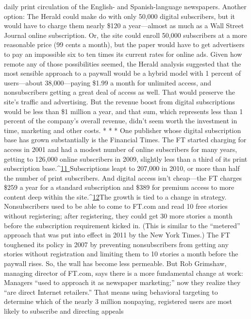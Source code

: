 daily print circulation of the English- and Spanish-language newspapers.
Another option: The Herald could make do with only 50,000 digital subscribers,
but it would have to charge them nearly \$120 a year—almost as much as a Wall
Street Journal online subscription. Or, the site could enroll 50,000 subscribers
at a more reasonable price (99 cents a month), but the paper would have to get
advertisers to pay an impossible six to ten times its current rates for online ads.
Given how remote any of those possibilities seemed, the Herald analysis suggested
that the most sensible approach to a paywall would be a hybrid model
with 1 percent of users—about 38,000—paying \$1.99 a month for unlimited access,
and nonsubscribers getting a great deal of access as well. That would preserve
the site’s traffic and advertising. But the revenue boost from digital subscriptions
would be less than \$1 million a year, and that sum, which represents less than 1
percent of the company’s overall revenue, didn’t seem worth the investment in
time, marketing and other costs.
* * *
One publisher whose digital subscription base has grown substantially is the
Financial Times.
The FT started charging for access in 2001 and had a modest number of online
subscribers for many years, getting to 126,000 online subscribers in 2009, slightly
less than a third of its print subscription base.^{\href{#endnotes-ch5}{11 }}Subscriptions leapt to 207,000
in 2010, or more than half the number of print subscribers. And digital access
isn’t cheap—the FT charges \$259 a year for a standard subscription and \$389 for
premium access to more content deep within the site.^{\href{#endnotes-ch5}{12}}The growth is tied to a change in strategy. Nonsubscribers used to be able to
come to FT.com and read 10 free stories without registering; after registering,
they could get 30 more stories a month before the subscription requirement
kicked in. (This is similar to the ``metered'' approach that was put into effect in
2011 by the New York Times.) The FT toughened its policy in 2007 by preventing
nonsubscribers from getting any stories without registration and limiting
them to 10 stories a month before the paywall rises.
So, the wall has become less permeable. But Rob Grimshaw, managing director
of FT.com, says there is a more fundamental change at work: Managers ``used to
approach it as newspaper marketing;'' now they realize they ``are direct Internet
retailers.''
That means using behavioral targeting to determine which of the nearly 3
million nonpaying, registered users are most likely to subscribe and directing appeals
